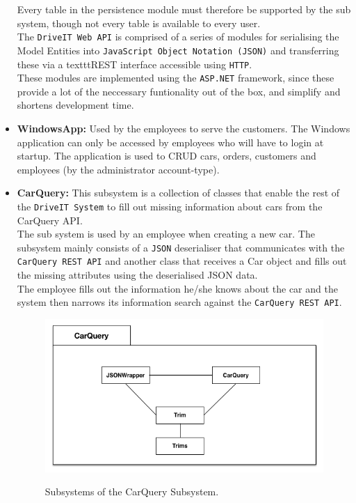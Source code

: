 \begin{itemize}
	Every table in the persistence module must therefore be supported by the sub system, though not every table is available to every user.\\
	The \texttt{DriveIT Web API} is comprised of a series of modules for serialising the Model Entities into \texttt{JavaScript Object Notation (JSON)} and transferring these via a texttt{REST} interface accessible using \texttt{HTTP}. \\
	These modules are implemented using the \texttt{ASP.NET} framework, since these provide a lot of the neccessary funtionality out of the box, and simplify and shortens development time.
	\item \textbf{WindowsApp:} Used by the employees to serve the customers. The Windows application can only be accessed by employees who will have to login at startup. The application is used to CRUD cars, orders, customers and employees (by the administrator account-type).
	\item \textbf{CarQuery:} This subsystem is a collection of classes that enable the rest of the \texttt{DriveIT System} to fill out missing information about cars from the CarQuery API.\\
	The sub system is used by an employee when creating a new car. The subsystem mainly consists of a \texttt{JSON} deserialiser that communicates with the \texttt{CarQuery REST API} and another class that receives a Car object and fills out the missing attributes using the deserialised JSON data. \\
	The employee fills out the information he/she knows about the car and the system then narrows its information search against the \texttt{CarQuery REST API}.
	\begin{figure}[h!]
		\centering
		\includegraphics[scale=0.30]{Figures/CarQuerySubsystemDecomposition}\\
		\caption{Subsystems of the CarQuery Subsystem.}
	\end{figure}
\end{itemize}